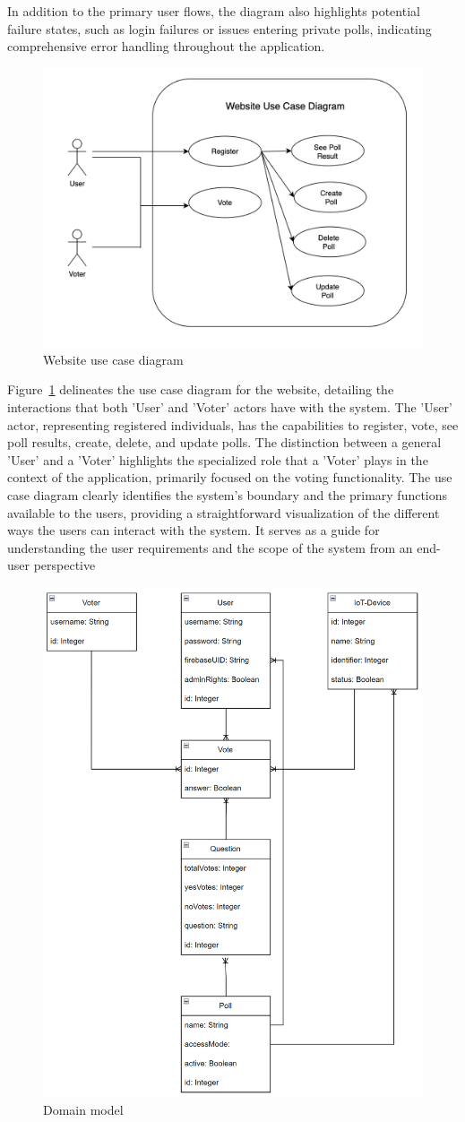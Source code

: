 In addition to the primary user flows, the diagram also highlights potential failure states, such as login failures or issues entering private polls, indicating comprehensive error handling throughout the application.
    


\begin{figure}[!htbp]
\centering
\includegraphics[width=0.5\linewidth]{figs/UserDiagram.png}
\caption{Website use case diagram}
\label{fig:userdiagram}
\end{figure}

Figure~\ref{fig:userdiagram} delineates the use case diagram for the website, detailing the interactions that both 'User' and 'Voter' actors have with the system. The 'User' actor, representing registered individuals, has the capabilities to register, vote, see poll results, create, delete, and update polls. The distinction between a general 'User' and a 'Voter' highlights the specialized role that a 'Voter' plays in the context of the application, primarily focused on the voting functionality. The use case diagram clearly identifies the system's boundary and the primary functions available to the users, providing a straightforward visualization of the different ways the users can interact with the system. It serves as a guide for understanding the user requirements and the scope of the system from an end-user perspective


\begin{figure}[!htbp]
\centering
\includegraphics[width=0.4\linewidth]{figs/DomainModel.png}
\caption{Domain model}
\label{fig:domainmodel}
\end{figure}

